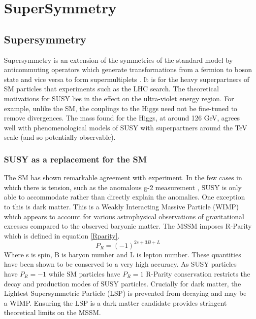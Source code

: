 
\chapter{SuperSymmetry} %

\label{Chapter3} %



\section{Supersymmetry}

Supersymmetry is an extension of the symmetries of the standard model by anticommuting operators which generate transformations from a fermion to boson state and vice versa to form supermultiplets \cite{susyintro}. It is for the heavy superpartners of SM particles that experiments such as the LHC search. The theoretical motivations for SUSY lies in the effect on the ultra-violet energy region. For example, unlike the SM, the couplings to the Higgs need not be fine-tuned to remove divergences. The mass found for the Higgs, at around 126 GeV, agrees well with phenomenological models of SUSY with superpartners around the TeV scale (and so potentially observable)\cite{susyhiggs}. 
\subsection{SUSY as a replacement for the SM}
The SM has shown remarkable agreement with experiment. In the few cases in which there is tension, such as the anomalous g-2 measurement \cite{gm2}, SUSY is only able to accommodate rather than directly explain the anomalies. One exception to this is dark matter. This is a Weakly Interacting Massive Particle (WIMP) which appears to account for various astrophysical observations of gravitational excesses compared to the observed baryonic matter\cite{dm}. The MSSM imposes R-Parity which is defined in equation \ref{Rparity}. 
\begin{equation}
\label{Rparity}
P_R=(-1)^{2s+3B+L}
\end{equation}
Where s is spin, B is baryon number and L is lepton number. These quantities have been shown to be conserved to a very high accuracy. As SUSY particles have $P_R=-1$ while SM particles have $P_R=1$ R-Parity conservation restricts the decay and production modes of SUSY particles\cite{susywimp}. Crucially for dark matter, the Lightest Supersymmetric Particle (LSP) is prevented from decaying and may be a WIMP. Ensuring the LSP is a dark matter candidate provides stringent theoretical limits on the MSSM.


